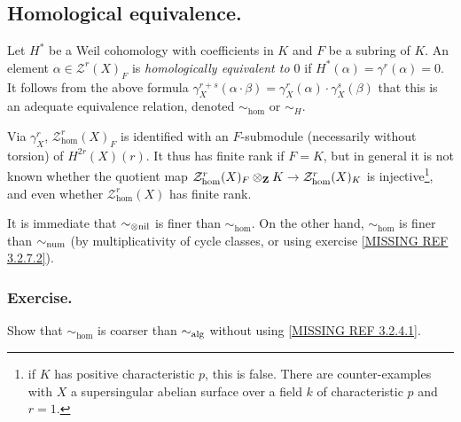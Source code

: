 \documentclass[../main.tex]{subfiles}
\begin{document}
\subsection{Homological equivalence.} Let $H^*$ be a Weil cohomology with coefficients in $K$ and $F$ be a subring of $K$.
An element $\alpha \in \mathcal{Z}^r(X)_F$ is \emph{homologically equivalent to $0$} if $H^*(\alpha) = \gamma^r(\alpha) = 0$.
It follows from the above formula $\gamma_X^{r+s}(\alpha \cdot \beta) = \gamma_X^r(\alpha) \cdot \gamma_X^s(\beta)$ that this is an adequate equivalence relation, denoted $\sim_{\hom}$ or $\sim_H$.

Via $\gamma_X^r$, $\mathcal{Z}_{\hom}^r(X)_F$ is identified with an $F$-submodule (necessarily without torsion) of $H^{2r}(X)(r)$.
It thus has finite rank if $F = K$, but in general it is not known whether the quotient map $\mathcal{Z}_{\mathrm{hom}}^r(X)_F \otimes_{\mathbf{Z}} K \to \mathcal{Z}_{\mathrm{hom}}^r(X)_K$ is injective\footnote{if $K$ has positive characteristic $p$, this is false. There are counter-examples with $X$ a supersingular abelian surface over a field $k$ of characteristic $p$ and $r = 1$.}, and even whether $\mathcal{Z}_{\hom}^r(X)$ has finite rank.

It is immediate that $\sim_{\otimes\mathrm{nil}}$ is finer than $\sim_{\hom}$.
On the other hand, $\sim_{\hom}$ is finer than $\sim_{\mathrm{num}}$ (by multiplicativity of cycle classes, or using exercise \ref{MISSING REF 3.2.7.2}).

\subsubsection{Exercise.} Show that $\sim_{\hom}$ is coarser than $\sim_{\mathrm{alg}}$ without using \ref{MISSING REF 3.2.4.1}.
\end{document}
